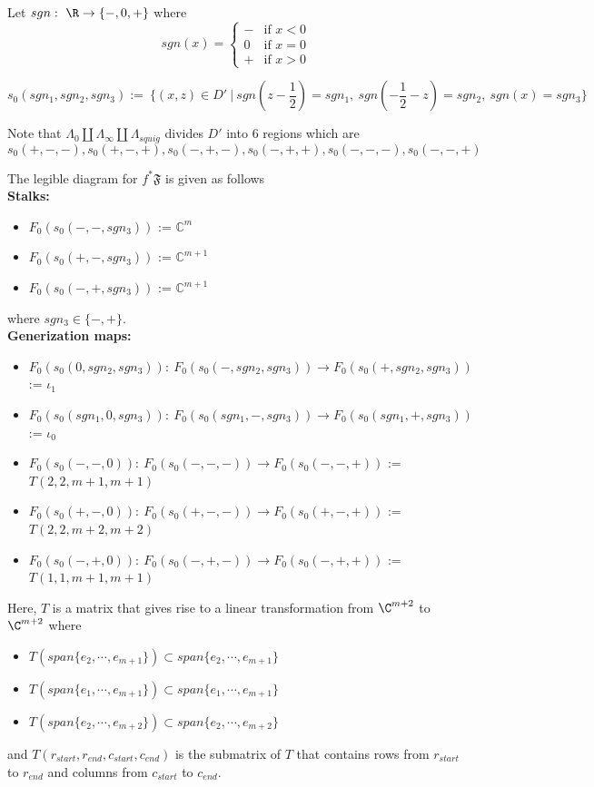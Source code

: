 \begin{definition}
Let $sgn:~\R \rightarrow \{-,0,+\}$ where
\[
sgn(x) = \begin{cases}
    - & \text{if } x < 0 \\
    0 & \text{if } x = 0 \\
    + & \text{if } x > 0
\end{cases}
\]
\end{definition}
\begin{definition}
\[
s_0(sgn_1,sgn_2,sgn_3):=~ \{(x,z) \in D' ~|~ sgn(z-\frac{1}{2})=sgn_1,~ sgn(-\frac{1}{2}-z)=sgn_2,~ sgn(x)=sgn_3 \}
\]
\end{definition}

Note that $\Lambda_0 \coprod \Lambda_\infty \coprod \Lambda_{squig}$ divides $D'$ into $6$ regions which are
\[
	s_0(+,-,-),s_0(+,-,+),s_0(-,+,-),s_0(-,+,+),s_0(-,-,-),s_0(-,-,+)
\]

The legible diagram for $f^*\mathfrak{F}$ is given as follows\\
\textbf{Stalks:}
\begin{itemize}
\item $F_0(s_0(-,-,sgn_3))$ := $\mathbb{C}^{m}$
\item $F_0(s_0(+,-,sgn_3))$ := $\mathbb{C}^{m+1}$
\item $F_0(s_0(-,+,sgn_3))$ := $\mathbb{C}^{m+1}$
\end{itemize}
where $sgn_3 \in \{-, + \}$.\\
\textbf{Generization maps:}
\begin{itemize}
\item $F_0(s_0(0,sgn_2,sgn_3)):~ F_0(s_0(-,sgn_2,sgn_3))\rightarrow F_0(s_0(+,sgn_2,sgn_3))$ := $\iota_1$ 

\item $F_0(s_0(sgn_1,0,sgn_3)):~ F_0(s_0(sgn_1,-,sgn_3))\rightarrow F_0(s_0(sgn_1,+,sgn_3))$ := $\iota_0$ 

\item $F_0(s_0(-,-,0)):~ F_0(s_0(-,-,-))\rightarrow F_0(s_0(-,-,+))$ := $T(2,2,m+1,m+1)$ 

\item $F_0(s_0(+,-,0)):~ F_0(s_0(+,-,-))\rightarrow F_0(s_0(+,-,+))$ := $T(2,2,m+2,m+2)$ 

\item $F_0(s_0(-,+,0)):~ F_0(s_0(-,+,-))\rightarrow F_0(s_0(-,+,+))$ := $T(1,1,m+1,m+1)$ 
\end{itemize}
Here, $T$ is a matrix that gives rise to a linear transformation from $\C^{m+2}$ to $\C^{m+2}$ where
\begin{itemize}
\item $T(span\{ e_2, \cdots, e_{m+1} \}) \subset span\{ e_2, \cdots, e_{m+1} \}$

\item $T(span\{ e_1, \cdots, e_{m+1} \}) \subset span\{ e_1, \cdots, e_{m+1} \}$

\item $T(span\{ e_2, \cdots, e_{m+2} \}) \subset span\{ e_2, \cdots, e_{m+2} \}$
\end{itemize}
and $T(r_{start},r_{end},c_{start},c_{end})$ is the submatrix of $T$ that contains rows from $r_{start}$ to $r_{end}$ and columns from $c_{start}$ to $c_{end}$.\\

